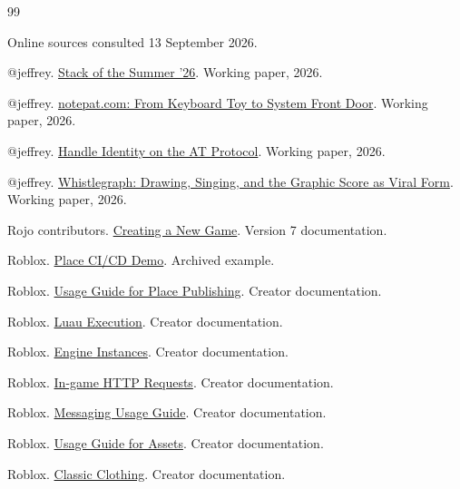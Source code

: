 \begin{thebibliography}{99}\small\setlength{\itemsep}{1pt}\setlength{\parskip}{0pt}

\item[] Online sources consulted 13 September 2026.

 @jeffrey. \href{https://papers.aesthetic.computer/stack-of-the-summer-26-arxiv.pdf}{Stack of the Summer '26}. Working paper, 2026.

 @jeffrey. \href{https://papers.aesthetic.computer/notepat-26-arxiv.pdf}{notepat.com: From Keyboard Toy to System Front Door}. Working paper, 2026.

 @jeffrey. \href{https://papers.aesthetic.computer/handle-identity-atproto-26-arxiv.pdf}{Handle Identity on the AT Protocol}. Working paper, 2026.

 @jeffrey. \href{https://papers.aesthetic.computer/whistlegraph-26-arxiv.pdf}{Whistlegraph: Drawing, Singing, and the Graphic Score as Viral Form}. Working paper, 2026.

 Rojo contributors. \href{https://rojo.space/docs/v7/getting-started/new-game/}{Creating a New Game}. Version 7 documentation.

 Roblox. \href{https://github.com/Roblox/place-ci-cd-demo}{Place CI/CD Demo}. Archived example.

 Roblox. \href{https://create.roblox.com/docs/cloud/guides/usage-place-publishing}{Usage Guide for Place Publishing}. Creator documentation.

 Roblox. \href{https://create.roblox.com/docs/cloud/reference/features/luau-execution}{Luau Execution}. Creator documentation.

 Roblox. \href{https://create.roblox.com/docs/cloud/guides/instance}{Engine Instances}. Creator documentation.

 Roblox. \href{https://create.roblox.com/docs/cloud-services/http-service}{In-game HTTP Requests}. Creator documentation.

 Roblox. \href{https://create.roblox.com/docs/cloud/guides/usage-messaging}{Messaging Usage Guide}. Creator documentation.

 Roblox. \href{https://create.roblox.com/docs/cloud/guides/usage-assets}{Usage Guide for Assets}. Creator documentation.

 Roblox. \href{https://create.roblox.com/docs/avatar/classic-clothing}{Classic Clothing}. Creator documentation.


\end{thebibliography}
